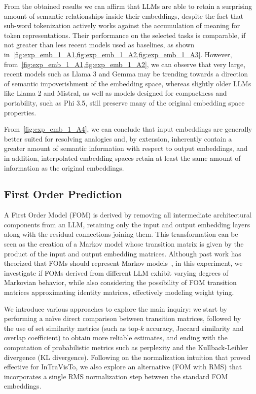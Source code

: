 \documentclass[11pt,a4paper,twocolumn]{article}
\begin{document}
From the obtained results we can affirm that LLMs are able to retain a surprising amount of semantic relationships inside their embeddings, despite the fact that sub-word tokenization actively works against the accumulation of meaning for token representations.
Their performance on the selected tasks is comparable, if not greater than less recent models used as baselines, as shown in~\cref{fig:exp_emb_1_A1,fig:exp_emb_1_A2,fig:exp_emb_1_A3}.
However, from~\cref{fig:exp_emb_1_A1,fig:exp_emb_1_A2}, we can observe that very large, recent models such as Llama 3 and Gemma may be trending towards a direction of semantic impoverishment of the embedding space, whereas slightly older LLMs like Llama 2 and Mistral, as well as models designed for compactness and portability, such as Phi 3.5, still preserve many of the original embedding space properties.

From~\cref{fig:exp_emb_1_A4}, we can conclude that input embeddings are generally better suited for resolving analogies and, by extension, inherently contain a greater amount of semantic information with respect to output embeddings, and in addition, interpolated embedding spaces retain at least the same amount of information as the original embeddings.

\subsection{First Order Prediction}

A First Order Model (FOM) is derived by removing all intermediate architectural components from an LLM, retaining only the input and output embedding layers along with the residual connections joining them.
This transformation can be seen as the creation of a Markov model whose transition matrix is given by the product of the input and output embedding matrices.
Although past work has theorized that FOMs should represent Markov models~\cite{elhage2021}, in this experiment, we investigate if FOMs derived from different LLM exhibit varying degrees of Markovian behavior, while also considering the possibility of FOM transition matrices approximating identity matrices, effectively modeling weight tying.

We introduce various approaches to explore the main inquiry: we start by performing a naïve direct comparison between transition matrices, followed by the use of set similarity metrics (such as top-$k$ accuracy, Jaccard similarity and overlap coefficient) to obtain more reliable estimates, and ending with the computation of probabilistic metrics such as perplexity and the Kullback-Leibler divergence (KL divergence).
Following on the normalization intuition that proved effective for InTraVisTo, we also explore an alternative (FOM with RMS) that incorporates a single RMS normalization step between the standard FOM embeddings.
\end{document}
